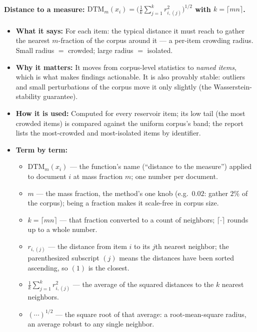 \documentclass[11pt,letterpaper]{article}
\newcommand{\dtm}{\mathrm{DTM}}
\begin{document}
\paragraph{Distance to a measure: $\dtm_m(x_i) = \big( \tfrac1k
\sum_{j=1}^{k} r_{i,(j)}^2 \big)^{1/2}$ with $k = \lceil m n \rceil$.}
\begin{itemize}
  \item \textbf{What it says:} For each item: the typical distance it must
  reach to gather the nearest $m$-fraction of the corpus around it --- a
  per-item crowding radius. Small radius $=$ crowded; large radius $=$
  isolated.
  \item \textbf{Why it matters:} It moves from corpus-level statistics to
  \emph{named items}, which is what makes findings actionable. It is also
  provably stable: outliers and small perturbations of the corpus move it
  only slightly (the Wasserstein-stability guarantee).
  \item \textbf{How it is used:} Computed for every reservoir item; its low
  tail (the most crowded items) is compared against the uniform corpus's
  band; the report lists the most-crowded and most-isolated items by
  identifier.
  \item \textbf{Term by term:}
  \begin{itemize}
    \item $\dtm_m(x_i)$ --- the function's name (``distance to the
    measure'') applied to document $i$ at mass fraction $m$; one number
    per document.
    \item $m$ --- the mass fraction, the method's one knob (e.g.\ $0.02$:
    gather $2\%$ of the corpus); being a fraction makes it scale-free in
    corpus size.
    \item $k = \lceil m n \rceil$ --- that fraction converted to a count of
    neighbors; $\lceil \cdot \rceil$ rounds up to a whole number.
    \item $r_{i,(j)}$ --- the distance from item $i$ to its $j$th nearest
    neighbor; the parenthesized subscript $(j)$ means the distances have
    been sorted ascending, so $(1)$ is the closest.
    \item $\tfrac1k \sum_{j=1}^{k} r_{i,(j)}^2$ --- the average of the
    squared distances to the $k$ nearest neighbors.
    \item $(\cdots)^{1/2}$ --- the square root of that average: a
    root-mean-square radius, an average robust to any single neighbor.
  \end{itemize}
\end{itemize}
\end{document}
